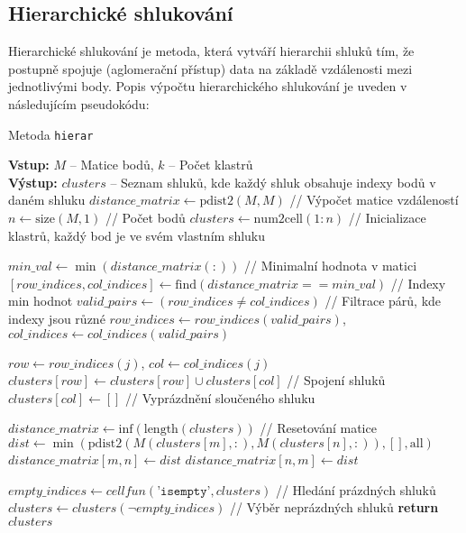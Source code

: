\subsection{Hierarchické shlukování}

Hierarchické shlukování je metoda, která vytváří hierarchii shluků tím, že postupně spojuje (aglomerační přístup) data na základě vzdálenosti mezi jednotlivými body. Popis výpočtu hierarchického shlukování je uveden v následujícím pseudokódu:

\begin{algorithm}
    \caption{Metoda \texttt{hierar}}
    \begin{algorithmic}[1]
        \STATE \textbf{Vstup:} $M$ -- Matice bodů, $k$ -- Počet klastrů\\
        \STATE \textbf{Výstup:} $clusters$ -- Seznam shluků, kde každý shluk obsahuje indexy bodů v daném shluku
        \STATE $distance\_matrix \gets \text{pdist2}(M, M)$ // Výpočet matice vzdáleností
        \STATE $n \gets \text{size}(M, 1)$ // Počet bodů
        \STATE $clusters \gets \text{num2cell}(1:n)$ // Inicializace klastrů, každý bod je ve svém vlastním shluku
        
            \STATE $min\_val \gets \min(distance\_matrix(:))$ // Minimalní hodnota v matici
            \STATE $[row\_indices, col\_indices] \gets \text{find}(distance\_matrix == min\_val)$ // Indexy min hodnot
            \STATE $valid\_pairs \gets (row\_indices \neq col\_indices)$ // Filtrace párů, kde indexy jsou různé
            \STATE $row\_indices \gets row\_indices(valid\_pairs)$, $col\_indices \gets col\_indices(valid\_pairs)$
            
                \STATE $row \gets row\_indices(j)$, $col \gets col\_indices(j)$
                \STATE $clusters[row] \gets clusters[row] \cup clusters[col]$ // Spojení shluků
                \STATE $clusters[col] \gets []$ // Vyprázdnění sloučeného shluku
            \ENDFOR

            \STATE $distance\_matrix \gets \text{inf}(\text{length}(clusters))$ // Resetování matice
                        \STATE $dist \gets \min(\text{pdist2}(M(clusters[m], :), M(clusters[n], :)), [], \text{all})$ 
                        \STATE $distance\_matrix[m, n] \gets dist$
                        \STATE $distance\_matrix[n, m] \gets dist$
                    \ENDIF
                \ENDFOR
            \ENDFOR
        \ENDFOR

        \STATE $empty\_indices \gets \textit{cellfun}(\texttt{'isempty'}, clusters)$ // Hledání prázdných shluků
        \STATE $clusters \gets clusters(\neg empty\_indices)$ // Výběr neprázdných shluků
        \STATE \textbf{return} $clusters$
    \end{algorithmic}
\end{algorithm}

